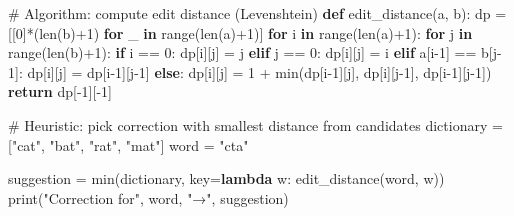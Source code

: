 \documentclass[
  letterpaper,
  DIV=11,
  numbers=noendperiod]{scrreprt}
\newenvironment{Shaded}{\begin{snugshade}}{\end{snugshade}}
\newcommand{\BuiltInTok}[1]{\textcolor[rgb]{0.00,0.23,0.31}{#1}}
\newcommand{\CommentTok}[1]{\textcolor[rgb]{0.37,0.37,0.37}{#1}}
\newcommand{\ControlFlowTok}[1]{\textcolor[rgb]{0.00,0.23,0.31}{\textbf{#1}}}
\newcommand{\DecValTok}[1]{\textcolor[rgb]{0.68,0.00,0.00}{#1}}
\newcommand{\KeywordTok}[1]{\textcolor[rgb]{0.00,0.23,0.31}{\textbf{#1}}}
\newcommand{\NormalTok}[1]{\textcolor[rgb]{0.00,0.23,0.31}{#1}}
\newcommand{\OperatorTok}[1]{\textcolor[rgb]{0.37,0.37,0.37}{#1}}
\newcommand{\StringTok}[1]{\textcolor[rgb]{0.13,0.47,0.30}{#1}}
\begin{document}
\begin{Shaded}
\begin{Highlighting}[]
\CommentTok{\# Algorithm: compute edit distance (Levenshtein)}
\KeywordTok{def}\NormalTok{ edit\_distance(a, b):}
\NormalTok{    dp }\OperatorTok{=}\NormalTok{ [[}\DecValTok{0}\NormalTok{]}\OperatorTok{*}\NormalTok{(}\BuiltInTok{len}\NormalTok{(b)}\OperatorTok{+}\DecValTok{1}\NormalTok{) }\ControlFlowTok{for}\NormalTok{ \_ }\KeywordTok{in} \BuiltInTok{range}\NormalTok{(}\BuiltInTok{len}\NormalTok{(a)}\OperatorTok{+}\DecValTok{1}\NormalTok{)]}
    \ControlFlowTok{for}\NormalTok{ i }\KeywordTok{in} \BuiltInTok{range}\NormalTok{(}\BuiltInTok{len}\NormalTok{(a)}\OperatorTok{+}\DecValTok{1}\NormalTok{):}
        \ControlFlowTok{for}\NormalTok{ j }\KeywordTok{in} \BuiltInTok{range}\NormalTok{(}\BuiltInTok{len}\NormalTok{(b)}\OperatorTok{+}\DecValTok{1}\NormalTok{):}
            \ControlFlowTok{if}\NormalTok{ i }\OperatorTok{==} \DecValTok{0}\NormalTok{:}
\NormalTok{                dp[i][j] }\OperatorTok{=}\NormalTok{ j}
            \ControlFlowTok{elif}\NormalTok{ j }\OperatorTok{==} \DecValTok{0}\NormalTok{:}
\NormalTok{                dp[i][j] }\OperatorTok{=}\NormalTok{ i}
            \ControlFlowTok{elif}\NormalTok{ a[i}\OperatorTok{{-}}\DecValTok{1}\NormalTok{] }\OperatorTok{==}\NormalTok{ b[j}\OperatorTok{{-}}\DecValTok{1}\NormalTok{]:}
\NormalTok{                dp[i][j] }\OperatorTok{=}\NormalTok{ dp[i}\OperatorTok{{-}}\DecValTok{1}\NormalTok{][j}\OperatorTok{{-}}\DecValTok{1}\NormalTok{]}
            \ControlFlowTok{else}\NormalTok{:}
\NormalTok{                dp[i][j] }\OperatorTok{=} \DecValTok{1} \OperatorTok{+} \BuiltInTok{min}\NormalTok{(dp[i}\OperatorTok{{-}}\DecValTok{1}\NormalTok{][j], dp[i][j}\OperatorTok{{-}}\DecValTok{1}\NormalTok{], dp[i}\OperatorTok{{-}}\DecValTok{1}\NormalTok{][j}\OperatorTok{{-}}\DecValTok{1}\NormalTok{])}
    \ControlFlowTok{return}\NormalTok{ dp[}\OperatorTok{{-}}\DecValTok{1}\NormalTok{][}\OperatorTok{{-}}\DecValTok{1}\NormalTok{]}

\CommentTok{\# Heuristic: pick correction with smallest distance from candidates}
\NormalTok{dictionary }\OperatorTok{=}\NormalTok{ [}\StringTok{"cat"}\NormalTok{, }\StringTok{"bat"}\NormalTok{, }\StringTok{"rat"}\NormalTok{, }\StringTok{"mat"}\NormalTok{]}
\NormalTok{word }\OperatorTok{=} \StringTok{"cta"}

\NormalTok{suggestion }\OperatorTok{=} \BuiltInTok{min}\NormalTok{(dictionary, key}\OperatorTok{=}\KeywordTok{lambda}\NormalTok{ w: edit\_distance(word, w))}
\BuiltInTok{print}\NormalTok{(}\StringTok{"Correction for"}\NormalTok{, word, }\StringTok{"→"}\NormalTok{, suggestion)}
\end{Highlighting}
\end{Shaded}
\end{document}
